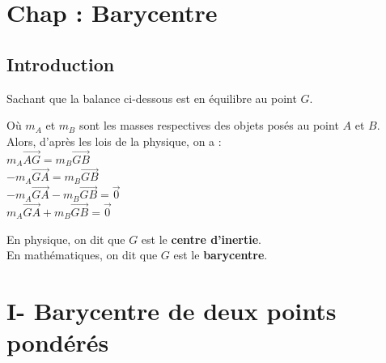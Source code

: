 \documentclass{article}
\begin{document}
\section*{Chap : Barycentre}

\subsection*{Introduction}

\noindent Sachant que la balance ci-dessous est en équilibre au point $G$.

\vspace{1em}

\begin{center}
\end{center}

\vspace{1em}

\noindent Où $m_A$ et $m_B$ sont les masses respectives des objets posés au point $A$ et $B$. \\
Alors, d'après les lois de la physique, on a : \\
$m_A \overrightarrow{AG} = m_B \overrightarrow{GB}$ \\
$-m_A \overrightarrow{GA} = m_B \overrightarrow{GB}$ \\
$-m_A \overrightarrow{GA} - m_B \overrightarrow{GB} = \vec{0}$ \\
$m_A \overrightarrow{GA} + m_B \overrightarrow{GB} = \vec{0}$

\vspace{1em}

\noindent En physique, on dit que $G$ est le \textbf{centre d'inertie}. \\
En mathématiques, on dit que $G$ est le \textbf{barycentre}.
\section*{I- Barycentre de deux points pondérés}
\end{document}
